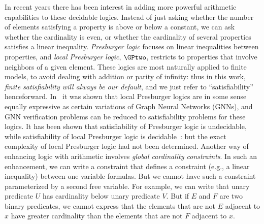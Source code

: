 In recent years there has been interest in adding more powerful arithmetic capabilities to these decidable logics. Instead of just asking whether the number of elements satisfying a property is above or below a constant, 
we can ask whether the cardinality is even, or whether 
the cardinality of several properties satisfies a linear inequality. 
\emph{Presburger logic} focuses on linear inequalities between properties, 
and \emph{local Presburger logic}, $\GPtwo$, restricts to properties that involve neighbors of a given element. 
These logics are most naturally applied to finite models, to avoid dealing with addition or parity of infinity: 
thus in this work, \emph{finite satisfiability will always be our default}, and 
we just refer to ``satisfiability'' henceforward. 
In~\cite{usicalp} it was shown that local Presburger logics are in some sense equally expressive as 
certain variations of Graph Neural Networks (GNNs), and 
GNN verification problems can be reduced to satisfiability problems for these logics.
It has been shown that satisfiability of Presburger logic is undecidable, while satisfiability of local Presburger logic is decidable~\cite{percentage}: but the exact complexity of local Presburger logic had not been determined. Another way of enhancing logic with arithmetic involves \emph{global cardinality constraints}. 
In such an enhancement, we can write a constraint that defines a constraint (e.g., a linear inequality) 
between one variable formulas. But we cannot have such a constraint parameterized by a second free variable.  For example, we can write that unary predicate $U$ has cardinality below unary predicate $V$. But if $E$ and $F$ are two binary predicates, we cannot express that the elements that are not $E$ adjacent to $x$ have greater cardinality than the elements that are not $F$ adjacent to $x$.

